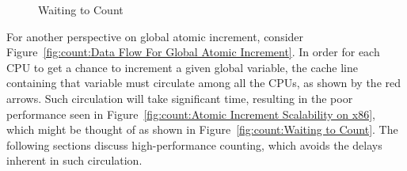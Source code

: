 \begin{figure}[tb]
\centering
{}
\caption{Waiting to Count}
\end{figure}

For another perspective on global atomic increment, consider
Figure~\ref{fig:count:Data Flow For Global Atomic Increment}.
In order for each CPU to get a chance to increment a given
global variable, the cache line containing that variable must
circulate among all the CPUs, as shown by the red arrows.
Such circulation will take significant time, resulting in
the poor performance seen in
Figure~\ref{fig:count:Atomic Increment Scalability on x86},
which might be thought of as shown in
Figure~\ref{fig:count:Waiting to Count}.
The following sections discuss high-performance counting, which
avoids the delays inherent in such circulation.

